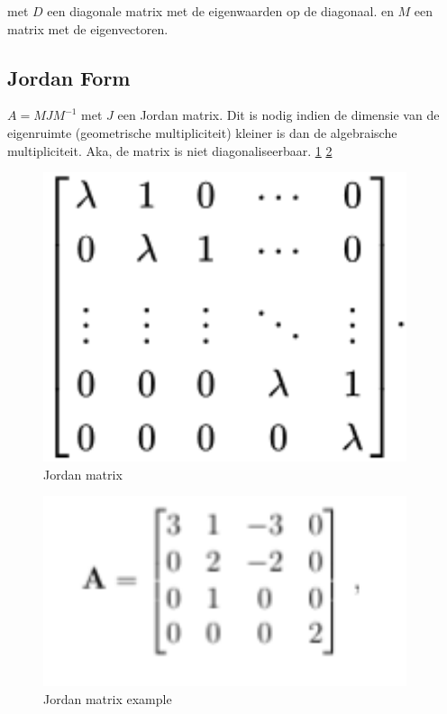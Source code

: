 \documentclass[a4paper]{report}
\begin{document}
met $D$ een diagonale matrix met de eigenwaarden op de diagonaal.
en $M$ een matrix met de eigenvectoren.

\subsection{Jordan Form}

$A = MJM^{-1}$
met $J$ een Jordan matrix.
Dit is nodig indien de dimensie van de eigenruimte (geometrische multipliciteit) kleiner is dan de algebraische multipliciteit.
Aka, de matrix is niet diagonaliseerbaar. \ref{fig:jordan} \ref{fig:jordan_ex}

\begin{figure}[htbp!]
	\begin{center}
		\includegraphics[width=0.95\textwidth]{./images/jordan.png}
	\end{center}
	\caption{Jordan matrix}
	\label{fig:jordan}
\end{figure}

\begin{figure}[htbp!]
	\begin{center}
		\includegraphics[width=0.95\textwidth]{./images/ex_joran.png}
	\end{center}
	\caption{Jordan matrix example}
	\label{fig:jordan_ex}
\end{figure}
\end{document}
